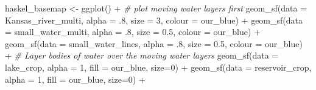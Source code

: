 \documentclass[
  paper=a4,
  ,captions=tableheading
]{scrartcl}
\newenvironment{Shaded}{\begin{snugshade}}{\end{snugshade}}
\newcommand{\AttributeTok}[1]{\textcolor[rgb]{0.77,0.63,0.00}{#1}}
\newcommand{\CommentTok}[1]{\textcolor[rgb]{0.56,0.35,0.01}{\textit{#1}}}
\newcommand{\DecValTok}[1]{\textcolor[rgb]{0.00,0.00,0.81}{#1}}
\newcommand{\FloatTok}[1]{\textcolor[rgb]{0.00,0.00,0.81}{#1}}
\newcommand{\FunctionTok}[1]{\textcolor[rgb]{0.00,0.00,0.00}{#1}}
\newcommand{\NormalTok}[1]{#1}
\newcommand{\OtherTok}[1]{\textcolor[rgb]{0.56,0.35,0.01}{#1}}
\newcommand{\SpecialCharTok}[1]{\textcolor[rgb]{0.00,0.00,0.00}{#1}}
\begin{document}
\begin{Shaded}
\begin{Highlighting}[]
\NormalTok{haskel\_basemap }\OtherTok{\textless{}{-}} \FunctionTok{ggplot}\NormalTok{() }\SpecialCharTok{+}
  \CommentTok{\# plot moving water layers first}
  \FunctionTok{geom\_sf}\NormalTok{(}\AttributeTok{data =}\NormalTok{ Kansas\_river\_multi, }\AttributeTok{alpha =}\NormalTok{ .}\DecValTok{8}\NormalTok{,}
          \AttributeTok{size =} \DecValTok{3}\NormalTok{, }\AttributeTok{colour =}\NormalTok{ our\_blue) }\SpecialCharTok{+}
  \FunctionTok{geom\_sf}\NormalTok{(}\AttributeTok{data =}\NormalTok{ small\_water\_multi, }\AttributeTok{alpha =}\NormalTok{ .}\DecValTok{8}\NormalTok{,}
          \AttributeTok{size =} \FloatTok{0.5}\NormalTok{, }\AttributeTok{colour =}\NormalTok{ our\_blue) }\SpecialCharTok{+}
  \FunctionTok{geom\_sf}\NormalTok{(}\AttributeTok{data =}\NormalTok{ small\_water\_lines, }\AttributeTok{alpha =}\NormalTok{ .}\DecValTok{8}\NormalTok{,}
          \AttributeTok{size =} \FloatTok{0.5}\NormalTok{, }\AttributeTok{colour =}\NormalTok{ our\_blue) }\SpecialCharTok{+}
  \CommentTok{\# Layer bodies of water over the moving water layers}
  \FunctionTok{geom\_sf}\NormalTok{(}\AttributeTok{data =}\NormalTok{ lake\_crop, }\AttributeTok{alpha =} \DecValTok{1}\NormalTok{, }\AttributeTok{fill =}\NormalTok{ our\_blue, }\AttributeTok{size=}\DecValTok{0}\NormalTok{) }\SpecialCharTok{+}
  \FunctionTok{geom\_sf}\NormalTok{(}\AttributeTok{data =}\NormalTok{ reservoir\_crop, }\AttributeTok{alpha =} \DecValTok{1}\NormalTok{, }\AttributeTok{fill =}\NormalTok{ our\_blue, }\AttributeTok{size=}\DecValTok{0}\NormalTok{) }\SpecialCharTok{+}
  

\end{Highlighting}
\end{Shaded}
\end{document}
